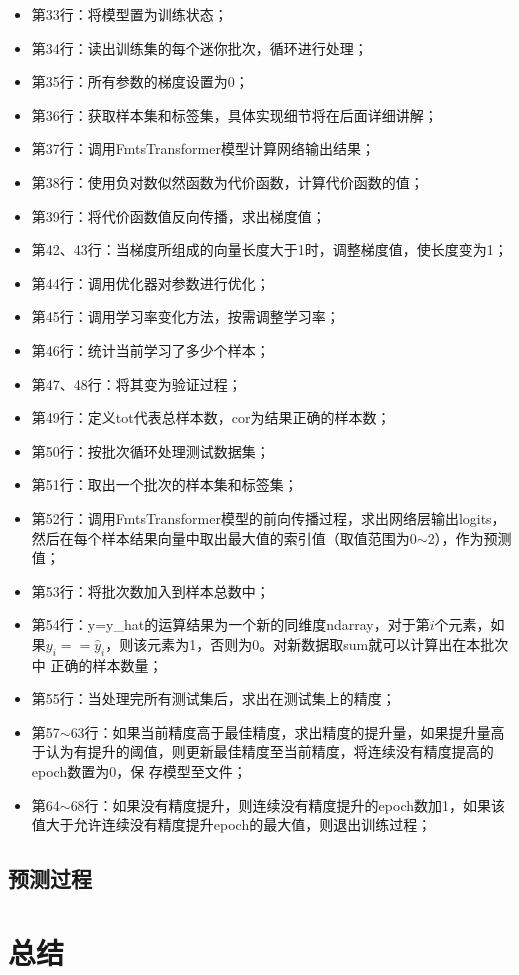 \begin{itemize}
    \item 第33行：将模型置为训练状态；
    \item 第34行：读出训练集的每个迷你批次，循环进行处理；
    \item 第35行：所有参数的梯度设置为0；
    \item 第36行：获取样本集和标签集，具体实现细节将在后面详细讲解；
    \item 第37行：调用FmtsTransformer模型计算网络输出结果；
    \item 第38行：使用负对数似然函数为代价函数，计算代价函数的值；
    \item 第39行：将代价函数值反向传播，求出梯度值；
    \item 第42、43行：当梯度所组成的向量长度大于1时，调整梯度值，使长度变为1；
    \item 第44行：调用优化器对参数进行优化；
    \item 第45行：调用学习率变化方法，按需调整学习率；
    \item 第46行：统计当前学习了多少个样本；
    \item 第47、48行：将其变为验证过程；
    \item 第49行：定义tot代表总样本数，cor为结果正确的样本数；
    \item 第50行：按批次循环处理测试数据集；
    \item 第51行：取出一个批次的样本集和标签集；
    \item 第52行：调用FmtsTransformer模型的前向传播过程，求出网络层输出logits，然后在每个样本结果向量中取出最大值的索引值（取值范围为0$\sim$2），作为预测值；
    \item 第53行：将批次数加入到样本总数中；
    \item 第54行：y=y\_hat的运算结果为一个新的同维度ndarray，对于第$i$个元素，如果$y_{i}==\hat{y}_{i}$，则该元素为1，否则为0。对新数据取sum就可以计算出在本批次中
    正确的样本数量；
    \item 第55行：当处理完所有测试集后，求出在测试集上的精度；
    \item 第57$\sim$63行：如果当前精度高于最佳精度，求出精度的提升量，如果提升量高于认为有提升的阈值，则更新最佳精度至当前精度，将连续没有精度提高的epoch数置为0，保
    存模型至文件；
    \item 第64$\sim$68行：如果没有精度提升，则连续没有精度提升的epoch数加1，如果该值大于允许连续没有精度提升epoch的最大值，则退出训练过程；
\end{itemize}

\subsection{预测过程}

\section{总结}